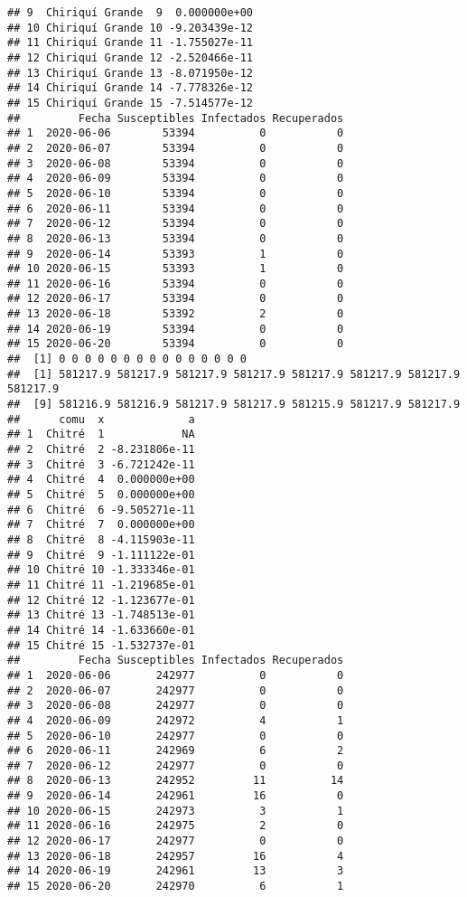 \documentclass[
]{article}
\begin{document}
\begin{verbatim}
## 9  Chiriquí Grande  9  0.000000e+00
## 10 Chiriquí Grande 10 -9.203439e-12
## 11 Chiriquí Grande 11 -1.755027e-11
## 12 Chiriquí Grande 12 -2.520466e-11
## 13 Chiriquí Grande 13 -8.071950e-12
## 14 Chiriquí Grande 14 -7.778326e-12
## 15 Chiriquí Grande 15 -7.514577e-12
##         Fecha Susceptibles Infectados Recuperados
## 1  2020-06-06        53394          0           0
## 2  2020-06-07        53394          0           0
## 3  2020-06-08        53394          0           0
## 4  2020-06-09        53394          0           0
## 5  2020-06-10        53394          0           0
## 6  2020-06-11        53394          0           0
## 7  2020-06-12        53394          0           0
## 8  2020-06-13        53394          0           0
## 9  2020-06-14        53393          1           0
## 10 2020-06-15        53393          1           0
## 11 2020-06-16        53394          0           0
## 12 2020-06-17        53394          0           0
## 13 2020-06-18        53392          2           0
## 14 2020-06-19        53394          0           0
## 15 2020-06-20        53394          0           0
##  [1] 0 0 0 0 0 0 0 0 0 0 0 0 0 0 0
##  [1] 581217.9 581217.9 581217.9 581217.9 581217.9 581217.9 581217.9 581217.9
##  [9] 581216.9 581216.9 581217.9 581217.9 581215.9 581217.9 581217.9
##      comu  x             a
## 1  Chitré  1            NA
## 2  Chitré  2 -8.231806e-11
## 3  Chitré  3 -6.721242e-11
## 4  Chitré  4  0.000000e+00
## 5  Chitré  5  0.000000e+00
## 6  Chitré  6 -9.505271e-11
## 7  Chitré  7  0.000000e+00
## 8  Chitré  8 -4.115903e-11
## 9  Chitré  9 -1.111122e-01
## 10 Chitré 10 -1.333346e-01
## 11 Chitré 11 -1.219685e-01
## 12 Chitré 12 -1.123677e-01
## 13 Chitré 13 -1.748513e-01
## 14 Chitré 14 -1.633660e-01
## 15 Chitré 15 -1.532737e-01
##         Fecha Susceptibles Infectados Recuperados
## 1  2020-06-06       242977          0           0
## 2  2020-06-07       242977          0           0
## 3  2020-06-08       242977          0           0
## 4  2020-06-09       242972          4           1
## 5  2020-06-10       242977          0           0
## 6  2020-06-11       242969          6           2
## 7  2020-06-12       242977          0           0
## 8  2020-06-13       242952         11          14
## 9  2020-06-14       242961         16           0
## 10 2020-06-15       242973          3           1
## 11 2020-06-16       242975          2           0
## 12 2020-06-17       242977          0           0
## 13 2020-06-18       242957         16           4
## 14 2020-06-19       242961         13           3
## 15 2020-06-20       242970          6           1

\end{verbatim}
\end{document}
